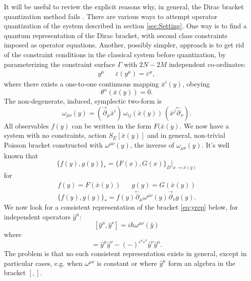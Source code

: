 \documentclass[a4paper,12pt]{article}
\theoremstyle{definition}
\theoremstyle{remark}
\numberwithin{equation}{section}
\newcommand{\al}{\alpha}
\newcommand{\om}{\omega}
\newcommand{\eps}{\varepsilon}
\newcommand{\yh}{\hat{y}}
\newcommand{\ra}{\rightarrow}
\newcommand{\bx}{\bar{x}}
\newcommand{\pl}{\overset{\leftarrow}{\partial}}
\newcommand{\pr}{\overset{\rightarrow}{\partial}}
\begin{document}
It will be useful to review the explicit reasons why, in general,
the Dirac bracket quantization method fails \cite{Henneaux:1992ig}.
There are various ways to attempt operator quantization of the
system described in section \ref{sec:Setting}. One way is to find a
quantum representation of the Dirac bracket, with second class
constraints imposed as operator equations.
Another, possibly simpler, approach is to get rid of the
constraint conditions in the classical system before quantization,
by parameterizing the constraint surface $\Gamma$ with $2N-2M$
independent co-ordinates:
\begin{eqnarray}
y^{\mu} && \eps(y^\mu)=\eps^\mu,
\end{eqnarray}
where there exists a one-to-one continuous mapping $\bx^i(y)$,
obeying
\begin{equation}
\theta^{\al}(\bx(y))=0.
\end{equation}
The non-degenerate, induced, symplectic two-form is
\begin{equation}\label{eq:omy}
\om_{\mu\nu}(y)=(\pr_{\mu}\bx^i) \,\om_{ij}(\bx(y))\,
(\bx^j\pl_{\nu}).
\end{equation}
All observables $f(y)$ can be written in the form $F(\bx(y)$. We
now have a system with no constraints, action $S_E[\bx(y)]$ and in
general, non-trivial Poisson bracket constructed with
$\om^{\mu\nu}(y)$, the inverse of $\om_{\mu\nu}(y)$. It's well
known \cite{Henneaux:1992ig} that
\begin{equation}\label{eq:starbracket}
\{f(y),g(y)\}_* = \{F(x),G(x)\}_D |_{x\ra \bx(y)}
\end{equation}
for
\begin{eqnarray}
f(y)=F(\bx(y)) && g(y)=G(\bx(y))
\end{eqnarray}
\begin{equation}
\{f(y),g(y)\}_*=f(y)\pl_\mu \om^{\mu\nu}(y) \pr_\nu g(y).
\end{equation}
We now look for a consistent representation of the bracket
\eqref{eq:yrep} below, for independent operators $\hat{y}^\mu$:
\begin{equation}\label{eq:yrep}
[\yh^\mu,\yh^\nu]=i\hbar \om^{\mu\nu}(\yh)
\end{equation}
where
\begin{equation}
[\yh^\mu,\yh^\nu]=\yh^\mu \yh^\nu -(-)^{\eps^\mu \eps^\nu} \yh^\nu
\yh^\mu.
\end{equation}
The problem is that no such consistent representation exists in
general, except in particular cases, e.g. when $\om^{\mu\nu}$ is
constant or where $\yh^\mu$ form an algebra in the bracket $[,]$.
\end{document}
